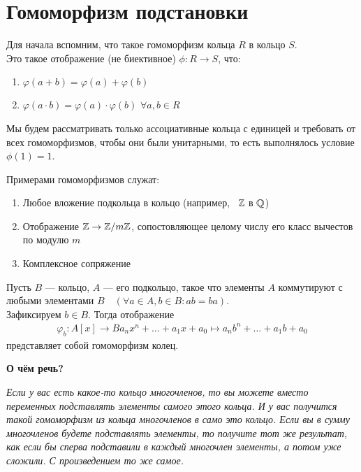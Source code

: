 \section{Гомоморфизм подстановки}
\begin{normalsize}
    Для начала вспомним, что такое гомоморфизм кольца $R$ в кольцо $S$. \\
    Это такое отображение (не биективное) $\phi: R \rightarrow S$, что:
    \begin{enumerate}
        \item $\varphi(a + b) = \varphi(a) + \varphi(b)$
        \item $\varphi(a\cdot b) = \varphi(a) \cdot \varphi(b)$
        $\forall a,b \in R$
    \end{enumerate}
    Мы будем рассматривать только ассоциативные кольца с единицей и требовать
    от всех гомоморфизмов, чтобы они были унитарными, то есть выполнялось
    условие $\phi(1) = 1$.
    
    Примерами гомоморфизмов служат:
    \begin{enumerate}
        \item Любое вложение подкольца в кольцо (например,  $\mathbb{Z}$ в $\mathbb{Q}$)
        \item Отображение $\mathbb{Z} \rightarrow \mathbb{Z} /m\mathbb{Z}$, сопостовляющее целому числу
        его класс вычестов по модулю $m$
        \item Комплексное сопряжение
    \end{enumerate}

    \begin{theorem-non}
        Пусть $B$ --- кольцо, $A$ --- его подкольцо, такое что элементы
        $A$ коммутируют с любыми элементами $B\quad (\forall a \in A, b \in B: ab = ba)$. \\
        Зафиксируем $b \in B$. Тогда отображение
        \begin{align*}
            \varphi_b: A[x] \rightarrow B
            a_nx^n + \dots + a_1x + a_0 \mapsto a_nb^n + \dots + a_1b + a_0
        \end{align*}
        представляет собой гомоморфизм колец.
    \end{theorem-non}

    \textbf{О чём речь?}

    \emph{Если у вас есть какое-то кольцо многочленов, то вы можете вместо переменных
    подставлять элементы самого этого кольца. И у вас получится такой гомоморфизм из
    кольца многочленов в само это кольцо. Если вы в сумму многочленов будете подставлять элементы,
    то получите тот же результат, как если бы сперва подставили в каждый многочлен элементы,
    а потом уже сложили. С произведением то же самое.} \\
    

\end{normalsize}
